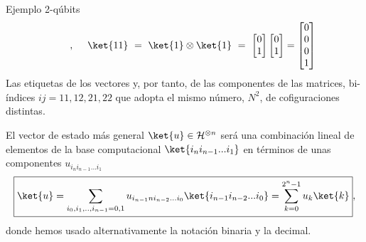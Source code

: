 \documentclass[a4paper,11pt]{book} %
\numberwithin{equation}{chapter}
\begin{document}
\begin{mybox_green}{Ejemplo 2-qúbits}
\begin{equation}
 ~~~~~,~~~~
\ket{11}~=~ \ket{1}\otimes \ket{1}~=~
\begin{bmatrix}0\\ 1\end{bmatrix}\begin{bmatrix}0\\ 1\end{bmatrix} = \begin{bmatrix}0\\0\\0 \\ 1\end{bmatrix}
\end{equation}
	Las etiquetas de los vectores y, por tanto, de las componentes de las matrices, bi-índices $ij=11,12,21,22$ 
	que adopta el mismo número, $N^2$, de cofiguraciones distintas. 
	\end{mybox_green}


El vector de estado más general  $\ket{u}\in \mathcal{H}^{\otimes n}$ será una combinación lineal de elementos de la base computacional $\ket{i_n i_{n-1}...i_1}$ en términos de unas componentes $u_{i_ni_{n-1}...i_1}$
	\begin{equation} \label{ec_multiqubit_u_general}
	\boxed{\ket{u} = \sum_{i_0,i_1,..,i_{n-1}=0,1} u_{i_{n-1}ni_{n-2}...i_0} \ket{i_{n-1} i_{n-2}...i_0}  = \sum_{k=0}^{2^n-1} u_k \ket{k}},
	\end{equation}
donde hemos usado alternativamente la notación binaria y la decimal. 
\end{document}
